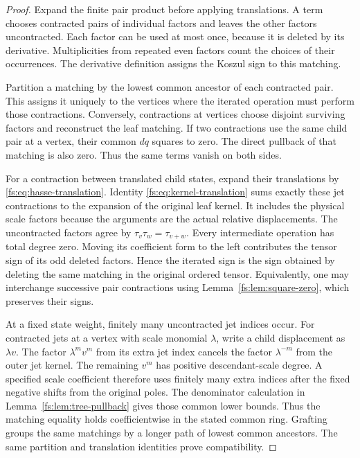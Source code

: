 \begin{proof}
Expand the finite pair product before applying translations.
A term chooses contracted pairs of individual factors and leaves
the other factors uncontracted.  Each factor can be used at most
once, because it is deleted by its derivative.  Multiplicities from
repeated even factors count the choices of their occurrences.
The derivative definition assigns the Koszul sign to this matching.

Partition a matching by the lowest common ancestor of each contracted
pair.  This assigns it uniquely to the vertices where the iterated
operation must perform those contractions.  Conversely, contractions
at vertices choose disjoint surviving factors and reconstruct the
leaf matching.  If two contractions use the same child pair at a
vertex, their common \(dq\) squares to zero.  The direct pullback
of that matching is also zero.  Thus the same terms vanish on
both sides.

For a contraction between translated child states, expand their
translations by \eqref{fs:eq:hasse-translation}.  Identity
\eqref{fs:eq:kernel-translation} sums exactly these jet contractions
to the expansion of the original leaf kernel.  It includes the
physical scale factors because the arguments are the actual relative
displacements.  The uncontracted factors agree by
\(\tau_v\tau_w=\tau_{v+w}\).
Every intermediate operation has total degree zero.  Moving its
coefficient form to the left contributes the tensor sign of its
odd deleted factors.  Hence the iterated sign is the sign obtained
by deleting the same matching in the original ordered tensor.
Equivalently, one may interchange successive pair contractions using
Lemma~\ref{fs:lem:square-zero}, which preserves their signs.

At a fixed state weight, finitely many uncontracted jet indices occur.
For contracted jets at a vertex with scale monomial \(\lambda\),
write a child displacement as \(\lambda v\).  The factor
\(\lambda^m v^m\) from its extra jet index cancels the factor
\(\lambda^{-m}\) from the outer jet kernel.  The remaining
\(v^m\) has positive descendant-scale degree.  A specified scale
coefficient therefore uses finitely many extra indices after the
fixed negative shifts from the original poles.  The denominator calculation in
Lemma~\ref{fs:lem:tree-pullback} gives those common lower bounds.
Thus the matching equality holds coefficientwise in the stated
common ring.  Grafting groups the same matchings by a longer path
of lowest common ancestors.  The same partition and translation
identities prove compatibility.
\end{proof}

